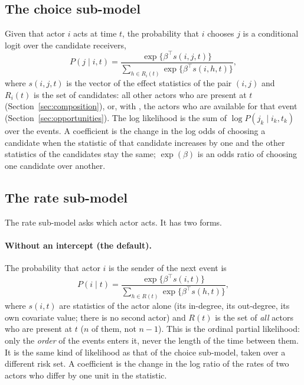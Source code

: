 \subsection{The choice sub-model}\label{sec:choicemodel}

Given that actor $i$ acts at time $t$, the probability that $i$ chooses $j$ is a conditional logit over the candidate receivers,
\begin{equation}\label{eq:choice}
  P(j\mid i,t)=\frac{\exp\{\beta^{\top}s(i,j,t)\}}{\sum_{h\in R_i(t)}\exp\{\beta^{\top}s(i,h,t)\}},
\end{equation}
where $s(i,j,t)$ is the vector of the effect statistics of the pair $(i,j)$ and $R_i(t)$ is the set of candidates: all other actors who are present at $t$ (Section~\ref{sec:composition}), or, with , the actors who are available for that event (Section~\ref{sec:opportunities}). The log likelihood is the sum of $\log P(j_k\mid i_k,t_k)$ over the events. A coefficient is the change in the log odds of choosing a candidate when the statistic of that candidate increases by one and the other statistics of the candidates stay the same; $\exp(\beta)$ is an odds ratio of choosing one candidate over another.

\subsection{The rate sub-model}\label{sec:ratemodel}

The rate sub-model asks which actor acts. It has two forms.

\paragraph{Without an intercept (the default).} The probability that actor $i$ is the sender of the next event is
\begin{equation}\label{eq:rate}
  P(i\mid t)=\frac{\exp\{\beta^{\top}s(i,t)\}}{\sum_{h\in R(t)}\exp\{\beta^{\top}s(h,t)\}},
\end{equation}
where $s(i,t)$ are statistics of the actor alone (its in-degree, its out-degree, its own covariate value; there is no second actor) and $R(t)$ is the set of \emph{all} actors who are present at $t$ ($n$ of them, not $n-1$). This is the ordinal partial likelihood: only the \emph{order} of the events enters it, never the length of the time between them. It is the same kind of likelihood as that of the choice sub-model, taken over a different risk set. A coefficient is the change in the log ratio of the rates of two actors who differ by one unit in the statistic.

